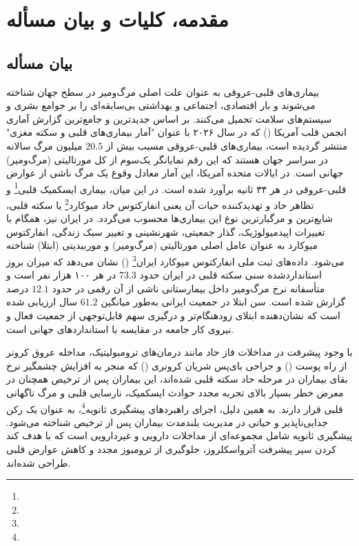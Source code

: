 \ChapterStart
\chapter{مقدمه، کلیات و بیان مسأله}
\label{ch:introduction}




\section{بیان مسأله}
\label{sec:problem-statement}


بیماری‌های قلبی-عروقی به عنوان علت اصلی مرگ‌ومیر در سطح جهان شناخته می‌شوند و بار اقتصادی، اجتماعی و بهداشتی بی‌سابقه‌ای را بر جوامع بشری و سیستم‌های سلامت تحمیل می‌کنند\cite{Palaniappan2026HeartStats}. بر اساس جدیدترین و جامع‌ترین گزارش آماری انجمن قلب آمریکا () که در سال ۲۰۲۶ با عنوان "آمار بیماری‌های قلبی و سکته مغزی" منتشر گردیده است، بیماری‌های قلبی-عروقی مسبب بیش از $20.5$ میلیون مرگ سالانه در سراسر جهان هستند که این رقم نمایانگر یک‌سوم از کل مورتالیتی (مرگ‌ومیر) جهانی است\cite{Palaniappan2026HeartStats}. در ایالات متحده آمریکا، این آمار معادل وقوع یک مرگ ناشی از عوارض قلبی-عروقی در هر ۳۴ ثانیه برآورد شده است\cite{Palaniappan2026HeartStats}. در این میان، بیماری ایسکمیک قلبی\footnote{} و تظاهر حاد و تهدیدکننده حیات آن یعنی انفارکتوس حاد میوکارد\footnote{} یا سکته قلبی، شایع‌ترین و مرگبارترین نوع این بیماری‌ها محسوب می‌گردد\cite{Palaniappan2026HeartStats,WHO2014NCD}. در ایران نیز، همگام با تغییرات اپیدمیولوژیک، گذار جمعیتی، شهرنشینی و تغییر سبک زندگی، انفارکتوس میوکارد به عنوان عامل اصلی مورتالیتی (مرگ‌ومیر) و موربیدیتی (ابتلا) شناخته می‌شود. داده‌های ثبت ملی انفارکتوس میوکارد ایران\footnote{} () نشان می‌دهد که میزان بروز استانداردشده سنی سکته قلبی در ایران حدود $73.3$ در هر ۱۰۰ هزار نفر است و متأسفانه نرخ مرگ‌ومیر داخل بیمارستانی ناشی از آن رقمی در حدود $12.1$ درصد گزارش شده است\cite{Beyranvand2023IranMI}. سن ابتلا در جمعیت ایرانی به‌طور میانگین $61.2$ سال ارزیابی شده است که نشان‌دهنده ابتلای زودهنگام‌تر و درگیری سهم قابل‌توجهی از جمعیت فعال و نیروی کار جامعه در مقایسه با استانداردهای جهانی است\cite{Beyranvand2023IranMI}.

با وجود پیشرفت‌ در مداخلات فاز حاد مانند درمان‌های ترومبولیتیک، مداخله عروق کرونر از راه پوست () و جراحی بای‌پس شریان کرونری () که منجر به افزایش چشمگیر نرخ بقای بیماران در مرحله حاد سکته قلبی شده‌اند، این بیماران پس از ترخیص همچنان در معرض خطر بسیار بالای تجربه مجدد حوادث ایسکمیک، نارسایی قلبی و مرگ ناگهانی قلبی قرار دارند\cite{Byrne2023ESC}. به همین دلیل، اجرای راهبردهای پیشگیری ثانویه\footnote{}، به عنوان یک رکن جدایی‌ناپذیر و حیاتی در مدیریت بلندمدت بیماران پس از ترخیص شناخته می‌شود. پیشگیری ثانویه شامل مجموعه‌ای از مداخلات دارویی و غیردارویی است که با هدف کند کردن سیر پیشرفت آترواسکلروز، جلوگیری از ترومبوز مجدد و کاهش عوارض قلبی طراحی شده‌اند\cite{Byrne2023ESC,Virani2023ChronicCoronary}.

